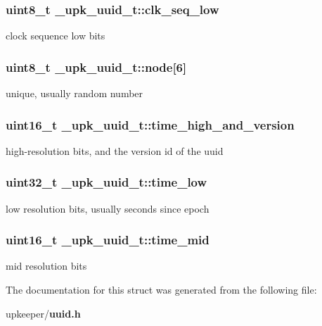 \subsubsection{\setlength{\rightskip}{0pt plus 5cm}uint8\_\-t \bf{\_\-upk\_\-uuid\_\-t::clk\_\-seq\_\-low}}\label{struct__upk__uuid__t_141319db51e51e80eff081acffc2fb29}


clock sequence low bits 
\subsubsection{\setlength{\rightskip}{0pt plus 5cm}uint8\_\-t \bf{\_\-upk\_\-uuid\_\-t::node}[6]}\label{struct__upk__uuid__t_ed0ce322aa069a1230c754bc88bacdb5}


unique, usually random number 
\subsubsection{\setlength{\rightskip}{0pt plus 5cm}uint16\_\-t \bf{\_\-upk\_\-uuid\_\-t::time\_\-high\_\-and\_\-version}}\label{struct__upk__uuid__t_d17a2e1fc22fc0eca3c4bc82ba90a087}


high-resolution bits, and the version id of the uuid 
\subsubsection{\setlength{\rightskip}{0pt plus 5cm}uint32\_\-t \bf{\_\-upk\_\-uuid\_\-t::time\_\-low}}\label{struct__upk__uuid__t_0ed9ad91aa20916db0713f1a4709171a}


low resolution bits, usually seconds since epoch 
\subsubsection{\setlength{\rightskip}{0pt plus 5cm}uint16\_\-t \bf{\_\-upk\_\-uuid\_\-t::time\_\-mid}}\label{struct__upk__uuid__t_a88ec5e5125d4edfe6a811c94a5f2264}


mid resolution bits 

The documentation for this struct was generated from the following file:\begin{CompactItemize}
\item 
upkeeper/\bf{uuid.h}\end{CompactItemize}
